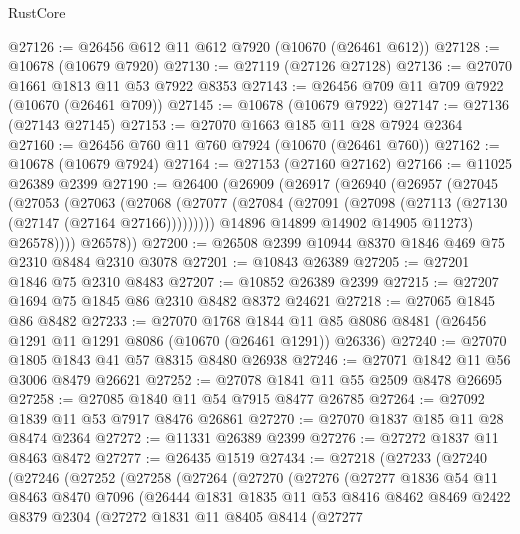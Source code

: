 \begin{lexlean}{RustCore}
\begin{coremodule}
@27126 := @26456 @612 @11 @612 @7920 (@10670 (@26461 @612))
@27128 := @10678 (@10679 @7920)
@27130 := @27119 (@27126 @27128)
@27136 := @27070 @1661 @1813 @11 @53 @7922 @8353
@27143 := @26456 @709 @11 @709 @7922 (@10670 (@26461 @709))
@27145 := @10678 (@10679 @7922)
@27147 := @27136 (@27143 @27145)
@27153 := @27070 @1663 @185 @11 @28 @7924 @2364
@27160 := @26456 @760 @11 @760 @7924 (@10670 (@26461 @760))
@27162 := @10678 (@10679 @7924)
@27164 := @27153 (@27160 @27162)
@27166 := @11025 @26389 @2399
@27190 := @26400
    (@26909
      (@26917
        (@26940
          (@26957
            (@27045
              (@27053
                (@27063
                  (@27068
                    (@27077 (@27084 (@27091 (@27098 (@27113 (@27130 (@27147 (@27164 @27166)))))))))
                  @14896
                  @14899
                  @14902
                  @14905
                  @11273)
                @26578))))
        @26578))
@27200 := @26508 @2399 @10944 @8370 @1846 @469 @75 @2310 @8484 @2310 @3078
@27201 := @10843 @26389
@27205 := @27201 @1846 @75 @2310 @8483
@27207 := @10852 @26389 @2399
@27215 := @27207 @1694 @75 @1845 @86 @2310 @8482 @8372 @24621
@27218 := @27065 @1845 @86 @8482
@27233 := @27070
    @1768
    @1844
    @11
    @85
    @8086
    @8481
    (@26456 @1291 @11 @1291 @8086 (@10670 (@26461 @1291)) @26336)
@27240 := @27070 @1805 @1843 @41 @57 @8315 @8480 @26938
@27246 := @27071 @1842 @11 @56 @3006 @8479 @26621
@27252 := @27078 @1841 @11 @55 @2509 @8478 @26695
@27258 := @27085 @1840 @11 @54 @7915 @8477 @26785
@27264 := @27092 @1839 @11 @53 @7917 @8476 @26861
@27270 := @27070 @1837 @185 @11 @28 @8474 @2364
@27272 := @11331 @26389 @2399
@27276 := @27272 @1837 @11 @8463 @8472
@27277 := @26435 @1519
@27434 := @27218
    (@27233
      (@27240
        (@27246
          (@27252
            (@27258
              (@27264
                (@27270
                  (@27276
                    (@27277
                      @1836
                      @54
                      @11
                      @8463
                      @8470
                      @7096
                      (@26444
                        @1831
                        @1835
                        @11
                        @53
                        @8416
                        @8462
                        @8469
                        @2422
                        @8379
                        @2304
                        (@27272
                          @1831
                          @11
                          @8405
                          @8414
                          (@27277

\end{coremodule}
\end{lexlean}
